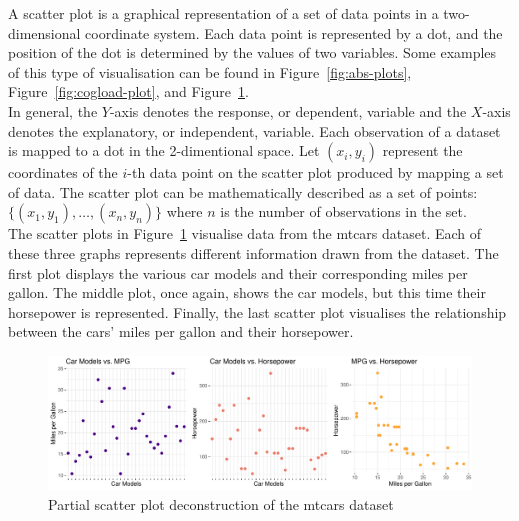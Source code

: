 \documentclass{article}\usepackage[]{graphicx}\usepackage[]{xcolor}
\makeatletter
\def\maxwidth{ %
  \ifdim\Gin@nat@width>\linewidth
    \linewidth
  \else
    \Gin@nat@width
  \fi
}
\newenvironment{knitrout}{}{} %
\numberwithin{equation}{section}
\makeatother
\begin{document}
A scatter plot is a graphical representation of a set of data points in a two-dimensional coordinate system. Each data point is represented by a dot, and the position of the dot is determined by the values of two variables. Some examples of this type of visualisation can be found in Figure~\ref{fig:abs-plots}, Figure~\ref{fig:cogload-plot}, and Figure~\ref{fig:bubble-plot-construction}.\\

\noindent
In general, the \(Y\)-axis denotes the response, or dependent, variable and the \(X\)-axis denotes the explanatory, or independent,  variable. Each observation of a dataset is mapped to a dot in the 2-dimentional space. Let \((x_i, y_i)\) represent the coordinates of the \(i\)-th data point on the scatter plot produced by mapping a set of data. The scatter plot can be mathematically described as a set of points: \( \{(x_1, y_1), \ldots, (x_n, y_n)\}\) where \(n\) is the number of observations in the set.\\

\noindent The scatter plots in Figure~\ref{fig:bubble-plot-construction} visualise data from the mtcars dataset. Each of these three graphs represents different information drawn from the dataset. The first plot displays the various car models and their corresponding miles per gallon. The middle plot, once again, shows the car models, but this time their horsepower is represented. Finally, the last scatter plot visualises the relationship between the cars' miles per gallon and their horsepower.

\begin{knitrout}\scriptsize
{}\color{fgcolor}\begin{figure}[H]

{\centering \includegraphics[width=\maxwidth]{figure/beamer-bubble-plot-construction-1} 

}

\caption[Partial scatter plot deconstruction of the mtcars dataset]{Partial scatter plot deconstruction of the mtcars dataset}\label{fig:bubble-plot-construction}
\end{figure}

\end{knitrout}
\end{document}
